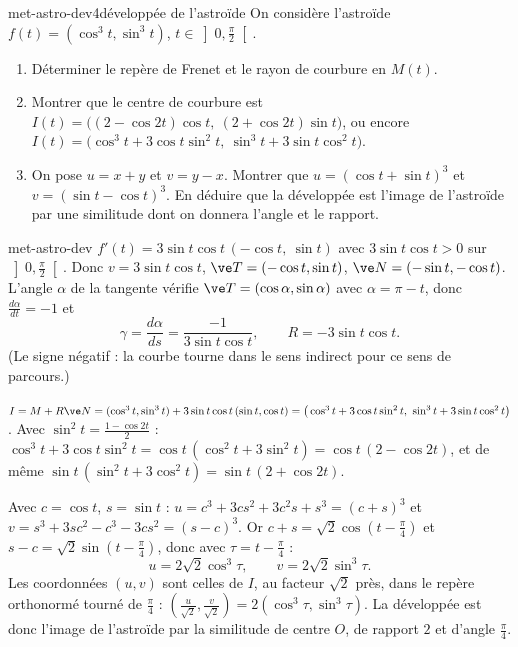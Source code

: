 \begin{exo}{met-astro-dev}{4}{développée de l'astroïde}
On considère l'astroïde $f(t)=(\cos^3t,\sin^3t)$, $t\in\left]0,\frac\pi2\right[$.
\begin{enumerate}
\item Déterminer le repère de Frenet et le rayon de courbure en $M(t)$.
\item Montrer que le centre de courbure est $I(t)=\big((2-\cos2t)\cos t,\ (2+\cos2t)\sin t\big)$, ou encore $I(t)=\big(\cos^3t+3\cos t\sin^2t,\ \sin^3t+3\sin t\cos^2t\big)$.
\item On pose $u=x+y$ et $v=y-x$. Montrer que $u=(\cos t+\sin t)^3$ et $v=(\sin t-\cos t)^3$. En déduire que la développée est l'image de l'astroïde par une similitude dont on donnera l'angle et le rapport.
\end{enumerate}
\end{exo}

\begin{corrige}{met-astro-dev}
 $f'(t)=3\sin t\cos t\,(-\cos t,\ \sin t)$ avec $3\sin t\cos t>0$ sur $\left]0,\frac\pi2\right[$. Donc $v=3\sin t\cos t$, $\ve T=(-\cos t,\sin t)$, $\ve N=(-\sin t,-\cos t)$. L'angle $\alpha$ de la tangente vérifie $\ve T=(\cos\alpha,\sin\alpha)$ avec $\alpha=\pi-t$, donc $\frac{d\alpha}{dt}=-1$ et
\[\gamma=\frac{d\alpha}{ds}=\frac{-1}{3\sin t\cos t},\qquad R=-3\sin t\cos t.\]
(Le signe négatif : la courbe tourne dans le sens indirect pour ce sens de parcours.)

 $I=M+R\ve N=(\cos^3t,\sin^3t)+3\sin t\cos t\,(\sin t,\cos t)=\big(\cos^3t+3\cos t\sin^2t,\ \sin^3t+3\sin t\cos^2t\big)$. Avec $\sin^2t=\frac{1-\cos2t}2$ : $\cos^3t+3\cos t\sin^2t=\cos t\,(\cos^2t+3\sin^2t)=\cos t\,(2-\cos2t)$, et de même $\sin t\,(\sin^2t+3\cos^2t)=\sin t\,(2+\cos2t)$.

 Avec $c=\cos t$, $s=\sin t$ : $u=c^3+3cs^2+3c^2s+s^3=(c+s)^3$ et $v=s^3+3sc^2-c^3-3cs^2=(s-c)^3$. Or $c+s=\sqrt2\cos\left(t-\frac\pi4\right)$ et $s-c=\sqrt2\sin\left(t-\frac\pi4\right)$, donc avec $\tau=t-\frac\pi4$ :
\[u=2\sqrt2\cos^3\tau,\qquad v=2\sqrt2\sin^3\tau.\]
Les coordonnées $(u,v)$ sont celles de $I$, au facteur $\sqrt2$ près, dans le repère orthonormé tourné de $\frac\pi4$ : $\left(\frac u{\sqrt2},\frac v{\sqrt2}\right)=2(\cos^3\tau,\sin^3\tau)$. La développée est donc l'image de l'astroïde par la similitude de centre $O$, de rapport $2$ et d'angle $\frac\pi4$.
\end{corrige}

